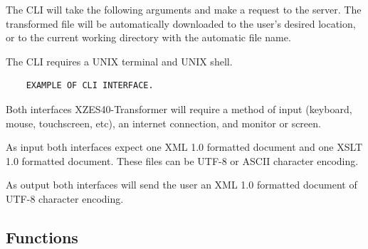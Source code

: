 \begin{description}
{        The CLI will take the following arguments and make a  request to the server.
        The transformed file will be automatically downloaded to the user's desired location, or to the current working directory with the automatic file name.

        The CLI requires a UNIX terminal and UNIX shell.
    }
    \begin{lstlisting}
    EXAMPLE OF CLI INTERFACE.
    \end{lstlisting}
\end{description}

Both interfaces XZES40-Transformer will require a method of input (keyboard, mouse, touchscreen, etc), an internet connection, and monitor or screen.

As input both interfaces expect one XML 1.0 formatted document and one XSLT 1.0 formatted document.
These files can be UTF-8 or ASCII character encoding.

As output both interfaces will send the user an XML 1.0 formatted document of UTF-8 character encoding.

% 

\subsection{Functions}

